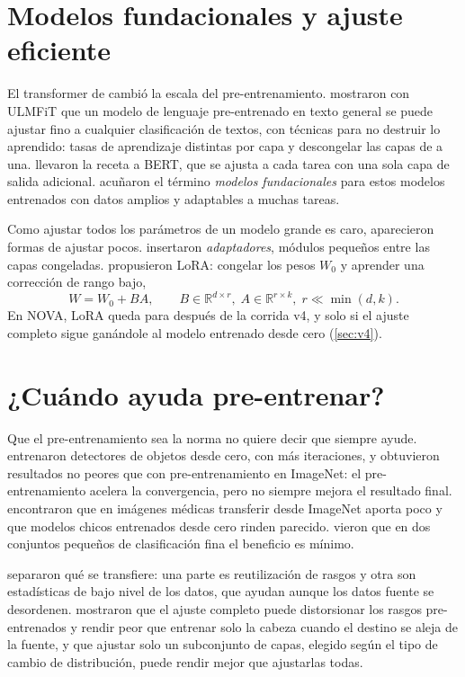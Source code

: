\section{Modelos fundacionales y ajuste eficiente}

El transformer de \textcite{vaswani2017} cambió la escala del pre-entrenamiento. \textcite{howard2018} mostraron con
ULMFiT que un modelo de lenguaje pre-entrenado en texto general se puede ajustar fino a cualquier clasificación de
textos, con técnicas para no destruir lo aprendido: tasas de aprendizaje distintas por capa y descongelar las capas de
a una. \textcite{devlin2019} llevaron la receta a BERT, que se ajusta a cada tarea con una sola capa de salida
adicional. \textcite{bommasani2021} acuñaron el término \emph{modelos fundacionales} para estos modelos entrenados con
datos amplios y adaptables a muchas tareas.

Como ajustar todos los parámetros de un modelo grande es caro, aparecieron formas de ajustar pocos.
\textcite{houlsby2019} insertaron \emph{adaptadores}, módulos pequeños entre las capas congeladas.
\textcite{hu2022} propusieron LoRA: congelar los pesos $W_0$ y aprender una corrección de rango bajo,
\begin{equation}\label{eq:lora}
W = W_0 + BA, \qquad B \in \mathbb{R}^{d \times r},\; A \in \mathbb{R}^{r \times k},\; r \ll \min(d, k).
\end{equation}
En NOVA, LoRA queda para después de la corrida v4, y solo si el ajuste completo sigue ganándole al modelo entrenado
desde cero (\cref{sec:v4}).

\section{¿Cuándo ayuda pre-entrenar?}\label{sec:cuando}

Que el pre-entrenamiento sea la norma no quiere decir que siempre ayude. \textcite{he2019} entrenaron detectores de
objetos desde cero, con más iteraciones, y obtuvieron resultados no peores que con pre-entrenamiento en ImageNet: el
pre-entrenamiento acelera la convergencia, pero no siempre mejora el resultado final. \textcite{raghu2019} encontraron
que en imágenes médicas transferir desde ImageNet aporta poco y que modelos chicos entrenados desde cero rinden
parecido. \textcite{kornblith2019} vieron que en dos conjuntos pequeños de clasificación fina el beneficio es mínimo.

\textcite{neyshabur2020} separaron qué se transfiere: una parte es reutilización de rasgos y otra son estadísticas de
bajo nivel de los datos, que ayudan aunque los datos fuente se desordenen. \textcite{kumar2022} mostraron que el ajuste
completo puede distorsionar los rasgos pre-entrenados y rendir peor que entrenar solo la cabeza cuando el destino se
aleja de la fuente, y \textcite{lee2023} que ajustar solo un subconjunto de capas, elegido según el tipo de cambio de
distribución, puede rendir mejor que ajustarlas todas.

